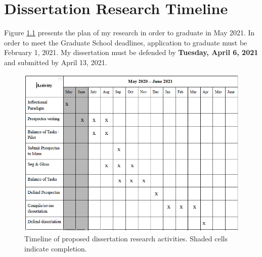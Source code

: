 \chapter{Dissertation Research Timeline}
\label{chap:timeline}

Figure \ref{fig:timeline} presents the plan of my research in order to graduate in May 2021. In order to meet the Graduate School deadlines, application to graduate must be February 1, 2021. My dissertation must be defended by \textbf{Tuesday, April 6, 2021} and submitted by April 13, 2021.

\begin{figure}[H]
    \centering
    \includegraphics[width=15cm]{figs/Timeline.png}
    \caption[Timeline]{Timeline of proposed dissertation research activities. Shaded cells indicate completion.}
    \label{fig:timeline}
\end{figure}